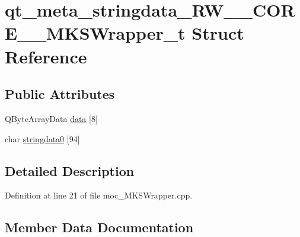 \hypertarget{structqt__meta__stringdata___r_w_____c_o_r_e_____m_k_s_wrapper__t}{}\section{qt\+\_\+meta\+\_\+stringdata\+\_\+\+R\+W\+\_\+\+\_\+\+C\+O\+R\+E\+\_\+\+\_\+\+M\+K\+S\+Wrapper\+\_\+t Struct Reference}
\label{structqt__meta__stringdata___r_w_____c_o_r_e_____m_k_s_wrapper__t}
\subsection*{Public Attributes}
\begin{DoxyCompactItemize}
\item 
Q\+Byte\+Array\+Data \hyperlink{structqt__meta__stringdata___r_w_____c_o_r_e_____m_k_s_wrapper__t_a56d1a9154896b56b5b9bfda69f57dce1}{data} \mbox{[}8\mbox{]}
\item 
char \hyperlink{structqt__meta__stringdata___r_w_____c_o_r_e_____m_k_s_wrapper__t_a3e76e021f0d5fc6df11f5a7760ef0411}{stringdata0} \mbox{[}94\mbox{]}
\end{DoxyCompactItemize}


\subsection{Detailed Description}


Definition at line 21 of file moc\+\_\+\+M\+K\+S\+Wrapper.\+cpp.



\subsection{Member Data Documentation}
\hypertarget{structqt__meta__stringdata___r_w_____c_o_r_e_____m_k_s_wrapper__t_a56d1a9154896b56b5b9bfda69f57dce1}{}\label{structqt__meta__stringdata___r_w_____c_o_r_e_____m_k_s_wrapper__t_a56d1a9154896b56b5b9bfda69f57dce1} 
